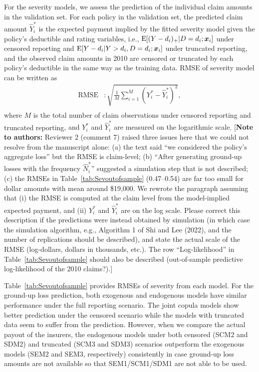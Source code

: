 \documentclass[11pt]{article}
\newcommand{\rev}[1]{{\color{blue}#1}}
\newcommand{\authnote}[1]{{\color{red}[\textbf{Note to authors:} #1]}}
\begin{document}
For the severity models, \rev{we assess the prediction of the individual claim amounts in the validation set. For each policy in the validation set, the predicted claim amount $\hat{Y}^*_i$ is the expected payment implied by the fitted severity model given the policy's deductible and rating variables, i.e., ${\rm E}[(Y-d_i)_+|D=d_i;\bm{x}_i]$ under censored reporting and ${\rm E}[Y-d_i|Y>d_i,D=d_i;\bm{x}_i]$ under truncated reporting, and the observed claim amounts in 2010 are censored or truncated by each policy's deductible in the same way as the training data.} RMSE of severity model can be written as
$$
\begin{aligned}
\text{RMSE}&: \sqrt{\frac{1}{M}\sum_{i=1}^{M} (Y^*_{i}-\hat{Y}^*_i)^2}, \\
\end{aligned}
$$
where $M$ is the total number of \rev{claim} observations under censored reporting and truncated reporting\rev{, and $Y^*_i$ and $\hat Y^*_i$ are measured on the logarithmic scale}.
\authnote{Reviewer 2 (comment 7) raised three issues here that we could not resolve from the manuscript alone: (a) the text said ``we considered the policy's aggregate loss'' but the RMSE is claim-level; (b) ``After generating ground-up losses with the frequency $\hat N^*_i$'' suggested a simulation step that is not described; (c) the RMSEs in Table~\ref{tab:Sevoutofsample} (0.47--0.54) are far too small for dollar amounts with mean around \$19,000. We rewrote the paragraph assuming that (i) the RMSE is computed at the claim level from the model-implied expected payment, and (ii) $Y^*_i$ and $\hat Y^*_i$ are on the log scale. Please correct this description if the predictions were instead obtained by simulation (in which case the simulation algorithm, e.g., Algorithm 1 of Shi and Lee (2022), and the number of replications should be described), and state the actual scale of the RMSE (log-dollars, dollars in thousands, etc.). The row ``Log-likelihood'' in Table~\ref{tab:Sevoutofsample} should also be described (out-of-sample predictive log-likelihood of the 2010 claims?).}

Table~\ref{tab:Sevoutofsample} provides RMSEs of severity from each model. For the ground-up loss prediction, both exogenous and endogenous models have similar performance \rev{under the} full\rev{ }reporting scenario. The joint copula models show better prediction under the censored scenario while the models with truncated data seem to suffer from the prediction. However, when we compare the actual payout of the insurers, the endogenous models under both censored (SCM2 and SDM2) and truncated (SCM3 and SDM3) scenarios outperform the exogenous models (SEM2 and SEM3, respectively) consistently in case ground-up loss amounts are not available so that SEM1/SCM1/SDM1 are not able to be used.
\end{document}
